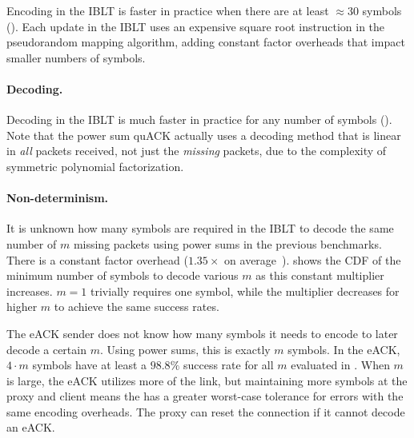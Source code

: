Encoding in the IBLT is faster in practice when there are at least
$\approx\!30$ symbols ().
Each update in the IBLT uses an expensive square root instruction in the
pseudorandom mapping algorithm, adding constant factor overheads that impact
smaller numbers of symbols.

\paragraph{Decoding.}

Decoding in the IBLT is much faster in practice for any number of symbols
(). Note that the power sum quACK actually uses a decoding
method that is linear in \textit{all} packets received, not just the \textit
{missing} packets, due to the complexity of symmetric polynomial
factorization.




\paragraph{Non-determinism.} It is unknown
 how many symbols are required in the IBLT to decode the same number of
 $m$ missing packets using power sums in the previous benchmarks. There is a constant
 factor overhead ($1.35\times$ on average~\cite{yang2024practical}).
  shows the CDF of the minimum number of symbols to decode
 various $m$ as this constant multiplier increases. $m=1$ trivially
 requires one symbol, while the multiplier decreases for higher $m$ to
 achieve the same success rates.

The eACK sender does not know how many symbols it needs to encode to later
decode a certain $m$. Using power sums, this is exactly $m$ symbols. In
the eACK, $4 \cdot m$ symbols have at least a $\!98.8\%$ success rate for
all $m$ evaluated in . When $m$ is large, the eACK utilizes more
of the link, but maintaining more symbols at the proxy and client means
the \Sys has a greater worst-case tolerance for errors with the same encoding
overheads. The \Sys proxy can reset the connection if it cannot decode an eACK.

